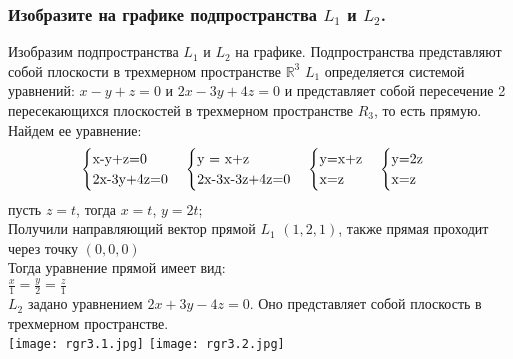 \documentclass{article}
\begin{document}
    \subsubsection{Изобразите на графике подпространства $L_1$ и $L_2$.}
    Изобразим подпространства $L_1$ и $L_2$ на графике. Подпространства представляют собой плоскости в трехмерном пространстве $\mathbb{R}^3$  $L_1$ определяется системой уравнений: $x-y+z=0$ и $2x - 3y+4z=0$ и представляет собой пересечение 2 пересекающихся плоскостей в трехмерном пространстве $R_3$, то есть прямую. Найдем ее уравнение:\\
    \begin{equation*}
        \begin{cases}
            $x-y+z=0$ \\
            $2x-3y+4z=0$\\
        \end{cases}
        \begin{cases}
            $y = x+z$\\
            $2x-3x-3z+4z=0$\\
        \end{cases}
        \begin{cases}
            $y=x+z$\\
            $x=z$\\
        \end{cases}
        \begin{cases}
            $y=2z$\\
            $x=z$\\
        \end{cases}
    \end{equation*}
    пусть $z=t$, тогда $x = t$, $y = 2t$; \\
    Получили направляющий вектор прямой $L_1$ $(1, 2, 1)$, также прямая проходит через точку $(0, 0, 0)$\\
    Тогда уравнение прямой имеет вид:\\
    $\frac{x}{1}=\frac{y}{2}=\frac{z}{1}$\\
    $L_2$ задано уравнением $2x+3y-4z=0$. Оно представляет собой плоскость в трехмерном пространстве. \\
    \texttt{[image: rgr3.1.jpg]}
    \texttt{[image: rgr3.2.jpg]}
    
\end{document}
